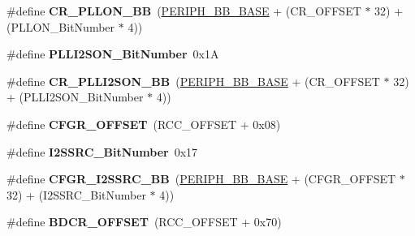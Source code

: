 \begin{DoxyCompactItemize}
\item 
\#define {\bfseries C\+R\+\_\+\+P\+L\+L\+O\+N\+\_\+\+BB}~(\hyperlink{group___peripheral__memory__map_gaed7efc100877000845c236ccdc9e144a}{P\+E\+R\+I\+P\+H\+\_\+\+B\+B\+\_\+\+B\+A\+SE} + (C\+R\+\_\+\+O\+F\+F\+S\+ET $\ast$ 32) + (P\+L\+L\+O\+N\+\_\+\+Bit\+Number $\ast$ 4))\hypertarget{group___r_c_c_ga3f1fb2589cb8b5ac2f7121aba1135a5f}{}\label{group___r_c_c_ga3f1fb2589cb8b5ac2f7121aba1135a5f}

\item 
\#define {\bfseries P\+L\+L\+I2\+S\+O\+N\+\_\+\+Bit\+Number}~0x1A\hypertarget{group___r_c_c_gabae59c3e4200523e3aa5b6e10aee8c46}{}\label{group___r_c_c_gabae59c3e4200523e3aa5b6e10aee8c46}

\item 
\#define {\bfseries C\+R\+\_\+\+P\+L\+L\+I2\+S\+O\+N\+\_\+\+BB}~(\hyperlink{group___peripheral__memory__map_gaed7efc100877000845c236ccdc9e144a}{P\+E\+R\+I\+P\+H\+\_\+\+B\+B\+\_\+\+B\+A\+SE} + (C\+R\+\_\+\+O\+F\+F\+S\+ET $\ast$ 32) + (P\+L\+L\+I2\+S\+O\+N\+\_\+\+Bit\+Number $\ast$ 4))\hypertarget{group___r_c_c_ga0c0fb27aba4eb660f7590252596bdfc5}{}\label{group___r_c_c_ga0c0fb27aba4eb660f7590252596bdfc5}

\item 
\#define {\bfseries C\+F\+G\+R\+\_\+\+O\+F\+F\+S\+ET}~(R\+C\+C\+\_\+\+O\+F\+F\+S\+ET + 0x08)\hypertarget{group___r_c_c_ga8682298330c3b9bae1992e4f1a0af985}{}\label{group___r_c_c_ga8682298330c3b9bae1992e4f1a0af985}

\item 
\#define {\bfseries I2\+S\+S\+R\+C\+\_\+\+Bit\+Number}~0x17\hypertarget{group___r_c_c_ga9561d436b438d8f513b754f1934c3e30}{}\label{group___r_c_c_ga9561d436b438d8f513b754f1934c3e30}

\item 
\#define {\bfseries C\+F\+G\+R\+\_\+\+I2\+S\+S\+R\+C\+\_\+\+BB}~(\hyperlink{group___peripheral__memory__map_gaed7efc100877000845c236ccdc9e144a}{P\+E\+R\+I\+P\+H\+\_\+\+B\+B\+\_\+\+B\+A\+SE} + (C\+F\+G\+R\+\_\+\+O\+F\+F\+S\+ET $\ast$ 32) + (I2\+S\+S\+R\+C\+\_\+\+Bit\+Number $\ast$ 4))\hypertarget{group___r_c_c_ga9076f5ddbb262fd45584702f5d280c9e}{}\label{group___r_c_c_ga9076f5ddbb262fd45584702f5d280c9e}

\item 
\#define {\bfseries B\+D\+C\+R\+\_\+\+O\+F\+F\+S\+ET}~(R\+C\+C\+\_\+\+O\+F\+F\+S\+ET + 0x70)\hypertarget{group___r_c_c_ga5f8a0c3cb5f5c835bf7eef09515138ad}{}\label{group___r_c_c_ga5f8a0c3cb5f5c835bf7eef09515138ad}


\end{DoxyCompactItemize}
